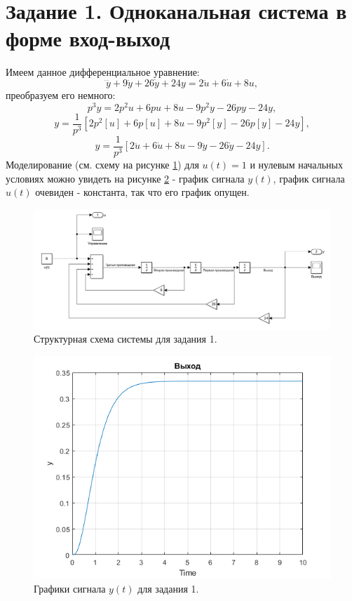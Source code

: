 \section*{Задание 1. Одноканальная система в форме вход-выход}

Имеем данное дифференциальное уравнение:
\begin{equation*}
    \dddot y + 9\ddot y + 26\dot y + 24 y = 2\ddot u +6\dot u +8 u,
\end{equation*}
преобразуем его немного:
\begin{equation*}
    p^3y=2p^2u+6pu+8u-9p^2y-26py-24y,
\end{equation*}
\begin{equation*}
    y=\frac{1}{p^3}[2p^2[u]+6p[u]+8u-9p^2[y]-26p[y]-24y],
\end{equation*}
\begin{equation*}
    y=\frac{1}{p^3}[2\ddot u+6\dot u+8u-9\ddot y-26\dot y-24y].
\end{equation*}
Моделирование (см. схему на рисунке \ref{fig:task_1_slx}) для $u(t)=1$ и 
нулевым начальных условиях можно увидеть на рисунке \ref{fig:task_1_y} - график сигнала $y(t)$,
график сигнала $u(t)$ очевиден - константа, так что его график опущен.

\begin{figure}[htbp]
    \centering
    \includegraphics[width=\linewidth]{figs/task_1_slx.png}
    \caption{Структурная схема системы для задания 1.}
    \label{fig:task_1_slx}
\end{figure}

\begin{figure}[htbp]
    \centering
    \includegraphics[width=0.7\linewidth]{figs/task_1_out.png}
    \caption{Графики сигнала $y(t)$ для задания 1.}
    \label{fig:task_1_y}
\end{figure}




